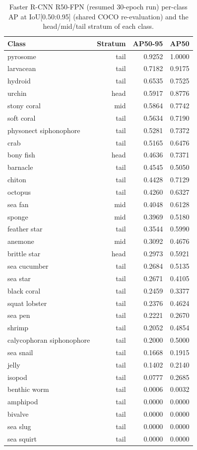 \documentclass[11pt,a4paper,twocolumn]{article}
\begin{document}
\begin{longtable}{@{}l r r r@{}}
  \caption{Faster R-CNN R50-FPN (resumed 30-epoch run) per-class AP at IoU[0.50:0.95] (shared COCO re-evaluation) and the head/mid/tail stratum of each class.}\\
  \toprule
  Class & Stratum & AP50-95 & AP50 \\
  \midrule
  \endhead
  pyrosome & tail & 0.9252 & 1.0000 \\
  larvacean & tail & 0.7182 & 0.9175 \\
  hydroid & tail & 0.6535 & 0.7525 \\
  urchin & head & 0.5917 & 0.8776 \\
  stony coral & mid & 0.5864 & 0.7742 \\
  soft coral & tail & 0.5634 & 0.7190 \\
  physonect siphonophore & tail & 0.5281 & 0.7372 \\
  crab & tail & 0.5165 & 0.6476 \\
  bony fish & head & 0.4636 & 0.7371 \\
  barnacle & tail & 0.4545 & 0.5050 \\
  chiton & tail & 0.4428 & 0.7129 \\
  octopus & tail & 0.4260 & 0.6327 \\
  sea fan & mid & 0.4048 & 0.6128 \\
  sponge & mid & 0.3969 & 0.5180 \\
  feather star & tail & 0.3544 & 0.5990 \\
  anemone & mid & 0.3092 & 0.4676 \\
  brittle star & head & 0.2973 & 0.5921 \\
  sea cucumber & tail & 0.2684 & 0.5135 \\
  sea star & tail & 0.2671 & 0.4105 \\
  black coral & tail & 0.2459 & 0.3377 \\
  squat lobster & tail & 0.2376 & 0.4624 \\
  sea pen & tail & 0.2221 & 0.2670 \\
  shrimp & tail & 0.2052 & 0.4854 \\
  calycophoran siphonophore & tail & 0.2000 & 0.5000 \\
  sea snail & tail & 0.1668 & 0.1915 \\
  jelly & tail & 0.1402 & 0.2140 \\
  isopod & tail & 0.0777 & 0.2685 \\
  benthic worm & tail & 0.0006 & 0.0032 \\
  amphipod & tail & 0.0000 & 0.0000 \\
  bivalve & tail & 0.0000 & 0.0000 \\
  sea slug & tail & 0.0000 & 0.0000 \\
  sea squirt & tail & 0.0000 & 0.0000 \\
  \bottomrule
\end{longtable}
\end{document}
